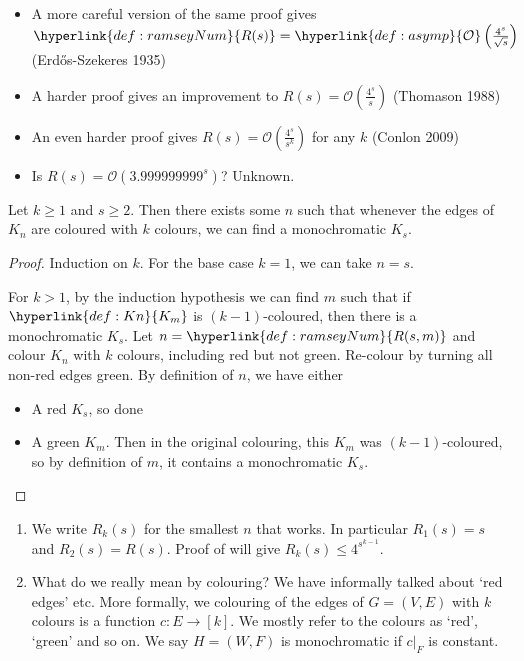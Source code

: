 \documentclass{article}
\newcommand{\red}[1]{\textcolor{bred}{#1}}
\newcommand{\green}[1]{\textcolor{bgreen}{#1}}
\begin{document}
\begin{remark}
    \leavevmode
    \begin{itemize}
        \item A more careful version of the same proof gives $\hyperlink{def:ramseyNum}{R(s)} = \hyperlink{def:asymp}{\mathcal{O}} \left(\frac{4^s}{\sqrt{s}}\right)$ (Erd\H{o}s-Szekeres 1935)
        \item A harder proof gives an improvement to $R(s) = \mathcal{O}\left(\frac{4^s}{s}\right)$ (Thomason 1988)
        \item An even harder proof gives $R(s) = \mathcal{O}\left(\frac{4^s}{s^k}\right)$ for any $k$ (Conlon 2009)
        \item Is $R(s) = \mathcal{O}\left(3.999999999^s\right)$? Unknown.
    \end{itemize}
\end{remark}

\begin{nthm}\label{thm:multiRamsey}
    Let $k \geq 1$ and $s \geq 2$.
    Then there exists some $n$ such that whenever the edges of \hyperlink{def:Kn}{$K_n$} are coloured with $k$ colours, we can find a monochromatic $K_s$.
\end{nthm}

\begin{proof}
    Induction on $k$. For the base case $k=1$, we can take $n=s$.

    For $k>1$, by the induction hypothesis we can find $m$ such that if $\hyperlink{def:Kn}{K_m}$ is $(k-1)$-coloured, then there is a monochromatic $K_s$.
    Let $n = \hyperlink{def:ramseyNum}{R(s, m)}$ and colour $K_n$ with $k$ colours, including \red{red} but not \green{green}.
    Re-colour by turning all non-red edges \green{green}.
    By definition of $n$, we have either
    \begin{itemize}
        \item A \red{red $K_s$}, so done
        \item A \green{green $K_m$}. Then in the original colouring, this $K_m$ was $(k-1)$-coloured, so by definition of $m$, it contains a monochromatic $K_s$. \qedhere
    \end{itemize}
\end{proof}

\begin{remark} \leavevmode
    \begin{enumerate}[label=\arabic*.]
        \item We write $R_k(s)$ for the smallest $n$ that works. In particular $R_1(s) = s$ and $R_2(s) = R(s)$.
            Proof of  will give $R_k(s) \leq 4^{s^{k-1}}$.
        \item What do we really mean by colouring?
            We have informally talked about `red edges' etc. More formally, we colouring of the edges of $G = (V, E)$ with $k$ colours is a function $c: E \to [k]$. We mostly refer to the colours as `red', `green' and so on.
            We say $H = (W, F)$ is monochromatic if $c |_F$ is constant.
    \end{enumerate}
\end{remark}
\end{document}
